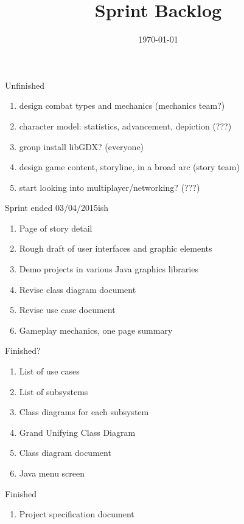 \documentclass[12pt]{article}
\title{Sprint Backlog}
\date{\today}
\begin{document}
\maketitle


\begin{section}{Unfinished}
\begin{enumerate}
\item design combat types and mechanics (mechanics team?)
\item character model: statistics, advancement, depiction (???)
\item group install libGDX? (everyone)
\item design game content, storyline, in a broad arc (story team)
\item start looking into multiplayer/networking? (???)


\end{enumerate}
\end{section}

\begin{section}{Sprint ended 03/04/2015ish}
\begin{enumerate}
\item Page of story detail
\item Rough draft of user interfaces and graphic elements
\item Demo projects in various Java graphics libraries
\item Revise class diagram document
\item Revise use case document
\item Gameplay mechanics, one page summary
\end{enumerate}
\end{section}

\begin{section}{Finished?}
\begin{enumerate}
\item List of use cases
\item List of subsystems
\item Class diagrams for each subsystem
\item Grand Unifying Class Diagram
\item Class diagram document
\item Java menu screen
\end{enumerate}
\end{section}

\begin{section}{Finished}
\begin{enumerate}
\item Project specification document
\end{enumerate}
\end{section}
\end{document}

